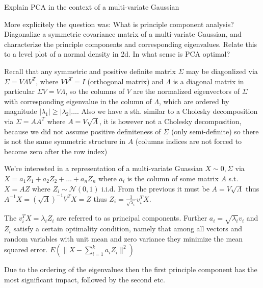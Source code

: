 Explain PCA in the context of a multi-variate Gaussian

More explicitely the question was:
What is principle component analysis? Diagonalize a symmetric covariance matrix of a multi-variate Gaussian, and characterize the principle components and
corresponding eigenvalues. Relate this to a level plot of a normal density in 2d. In
what sense is PCA optimal?

Recall that any symmetric and positive definite matrix \( \Sigma \) may be diagonlized
via \( \Sigma = V\Lambda V^{T} \), where \( VV^{T} = I \) (orthogonal matrix) and \( \Lambda \) is a diagonal matrix
in particular \( \Sigma V = V\Lambda \), so the columns of \( V \) are the normalized eigenvectors of \( \Sigma \)
with corresponding eigenvalue in the column of \( \Lambda \), which are ordered by magnitude \( |\lambda_1| \geq |\lambda_2| \dots \).
Also we have a sth. similar to a Cholesky decomposition via \( \Sigma = AA^{T} \) where \( A = V\sqrt{\Lambda} \),
it is however not a Cholesky decomposition, because we did not assume positive definiteness of \( \Sigma \) (only semi-definite)
so there is not the same symmetric structure in \( A \) (columns indices are not forced to become zero after the row index)

We're interested in a representation of a multi-variate Guassian \( X \sim \mathcal{0, \Sigma} \)
via \( X = a_1Z_1 + a_2Z_2 + \dots + a_nZ_n\) where \( a_i \) is the column of some matrix \( A \)
s.t. \( X = AZ \) where \( Z_i \sim \mathcal{N}(0, 1) \) i.i.d.
From the previous it must be \( A = V\sqrt{\Lambda} \) thus \( A^{-1}X = (\sqrt{\Lambda})^{-1}V^{T}X = Z \) 
thus \( Z_i = \frac{1}{\sqrt{\lambda_i}}v_i^{T}X \).

The \( v_i^{T}X = \lambda_iZ_i \) are referred to as principal components.
Further  \( a_i = \sqrt{\lambda_i}v_i \) and \( Z_i \) satisfy a certain optimality condition,
namely that among all vectors and random variables with unit mean and zero variance 
they minimize the mean squared error.
\( E(\|X - \sum_{i=1}^{k} a_i Z_i\|^{2}) \)

Due to the ordering of the eigenvalues then the first principle component has the most significant impact,
followed by the second etc.
